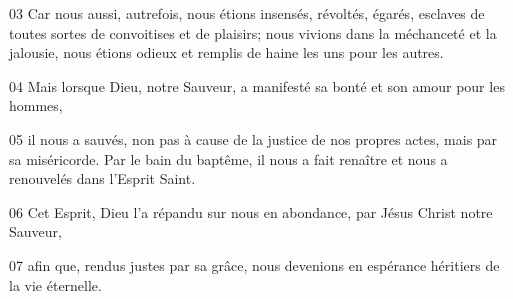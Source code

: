 
03 Car nous aussi, autrefois, nous étions insensés, révoltés, égarés, esclaves de toutes sortes de convoitises et de plaisirs; nous vivions dans la méchanceté et la jalousie, nous étions odieux et remplis de haine les uns pour les autres.

04 Mais lorsque Dieu, notre Sauveur, a manifesté sa bonté et son amour pour les hommes,

05 il nous a sauvés, non pas à cause de la justice de nos propres actes, mais par sa miséricorde. Par le bain du baptême, il nous a fait renaître et nous a renouvelés dans l’Esprit Saint.

06 Cet Esprit, Dieu l’a répandu sur nous en abondance, par Jésus Christ notre Sauveur,

07 afin que, rendus justes par sa grâce, nous devenions en espérance héritiers de la vie éternelle.
